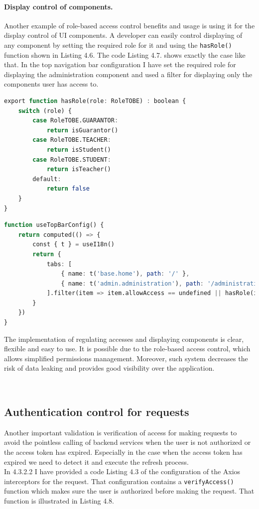 \paragraph*{Display control of components.} Another example of role-based access control benefits and usage is using it for the display control of UI components. A developer can easily control displaying of any component by setting the required role for it and using the \texttt{hasRole()} function shown in Listing 4.6. The code Listing 4.7. shows exactly the case like that. In the top navigation bar configuration I have set the required role for displaying the administration component and used a filter for displaying only the components user has access to.

\begin{lstlisting}[language=Octave, caption=Role validation]
export function hasRole(role: RoleTOBE) : boolean {
    switch (role) {
        case RoleTOBE.GUARANTOR:
            return isGuarantor()
        case RoleTOBE.TEACHER:
            return isStudent()
        case RoleTOBE.STUDENT:
            return isTeacher()
        default:
            return false
    }
}
\end{lstlisting}


\begin{lstlisting}[language=Octave, caption=Filtering displayed components by role]
function useTopBarConfig() {
    return computed(() => {
        const { t } = useI18n()
        return {
            tabs: [
                { name: t('base.home'), path: '/' },
                { name: t('admin.administration'), path: '/administration' , allowAccess: Role.GUARANTOR },
            ].filter(item => item.allowAccess == undefined || hasRole(item.allowAccess))
        }
    })
}
\end{lstlisting}



\noindent The implementation of regulating accesses and displaying components is clear, flexible and easy to use. It is possible due to the role-based access control, which allows simplified permissions management. Moreover, such system decreases the risk of data leaking and provides good visibility over the application.


\

\subsection{Authentication control for requests} Another important validation is verification of access for making requests to avoid the pointless calling of backend services when the user is not authorized or the access token has expired. Especially in the case when the access token has expired we need to detect it and execute the refresh process.\\
In 4.3.2.2 I have provided a code Listing 4.3 of the configuration of the Axios interceptors for the request. That configuration contains a \texttt{verifyAccess()} function which makes sure the user is authorized before making the request. That function is illustrated in Listing 4.8.\\


